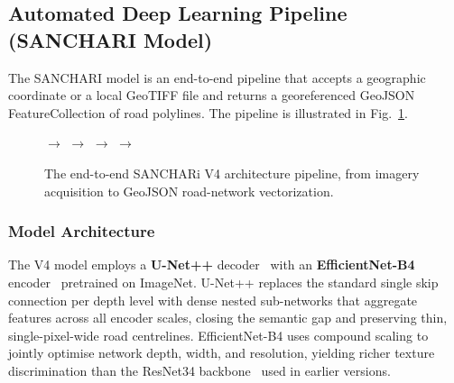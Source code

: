 \documentclass[10pt,a4paper,twocolumn]{article}
\begin{document}
\subsection{Automated Deep Learning Pipeline (SANCHARI Model)}

The SANCHARI model is an end-to-end pipeline that accepts a geographic
coordinate or a local GeoTIFF file and returns a georeferenced GeoJSON
FeatureCollection of road polylines. The pipeline is illustrated in
Fig.~\ref{fig:sanchari_pipeline}.

\begin{figure}[t]
\centering
{}\hspace{0.15cm}$\longrightarrow$\hspace{0.15cm}
\hspace{0.15cm}$\longrightarrow$\hspace{0.15cm}
\hspace{0.15cm}$\longrightarrow$\hspace{0.15cm}
\hspace{0.15cm}$\longrightarrow$\hspace{0.15cm}
\caption{The end-to-end SANCHARi V4 architecture pipeline, from imagery acquisition to GeoJSON road-network vectorization.}
\label{fig:sanchari_pipeline}
\end{figure}

\subsubsection{Model Architecture}

The V4 model employs a \textbf{U-Net++} decoder~\cite{b13} with an
\textbf{EfficientNet-B4} encoder~\cite{b14} pretrained on ImageNet. U-Net++
replaces the standard single skip connection per depth level with
dense nested sub-networks that aggregate features across all encoder
scales, closing the semantic gap and preserving thin, single-pixel-wide
road centrelines. EfficientNet-B4 uses compound scaling to jointly
optimise network depth, width, and resolution, yielding richer texture
discrimination than the ResNet34 backbone~\cite{b12} used in earlier versions.
\end{document}
